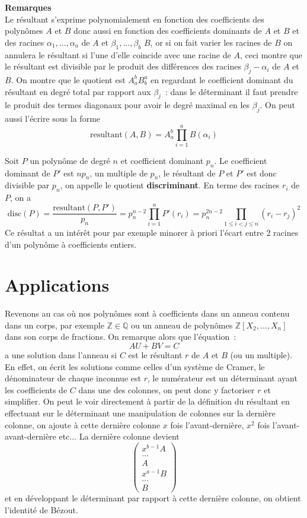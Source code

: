 \documentclass[a4paper,11pt]{book}
\begin{document}
\begin{giacjshere}
{\bf Remarques}\\
Le résultant s'exprime polynomialement en fonction
des coefficients des polynômes $A$ et $B$ donc aussi en fonction
des coefficients dominants de $A$ et $B$ et des racines 
$\alpha_1,..., \alpha_a$ de $A$ et $\beta_1,...,\beta_b$ $B$,
or si on fait varier les racines de $B$ on annulera le résultant
si l'une d'elle coincide avec une racine de $A$, ceci montre
que le résultant est divisible par le produit des 
différences des racines $\beta_j-\alpha_i$ de $A$ et $B$. 
On montre que le quotient 
est $A_a^b B_b^a$ en regardant le coefficient
dominant du résultant en degr\'e total par rapport aux $\beta_j$~:
dans le d\'eterminant il faut prendre le produit des termes diagonaux
pour avoir le degr\'e maximal en les $\beta_j$.
On peut aussi l'\'ecrire sous la forme
$$ \mbox{resultant}(A,B)=A_a^b \prod_{i=1}^a B(\alpha_i)$$

Soit $P$ un polyn\^ome de degr\'e $n$ et coefficient dominant $p_n$.
Le coefficient dominant de $P'$ est $np_n$, un multiple de $p_n$, 
le r\'esultant de $P$ et $P'$ est donc divisible
par $p_n$, on appelle le quotient
{\bf discriminant}. En terme des racines $r_i$ de $P$, on a
$$ \mbox{disc}(P)=\frac{\mbox{resultant}(P,P')}{p_n}
=p_n^{n-2} \prod_{i=1}^n P'(r_i) = p_n^{2n-2} \prod_{1\leq i<j\leq n} (r_i-r_j)^2$$
Ce résultat a un intérêt pour par exemple minorer à priori l'écart entre
2 racines d'un polynôme à coefficients entiers.


\section{Applications}
Revenons au cas o\`u nos polyn\^omes sont \`a coefficients dans un
anneau contenu dans un corps, par exemple $\mathbb{Z} \in \mathbb{Q}$ ou un anneau 
de polyn\^omes $\mathbb{Z}[X_2,...,X_n] $  dans son corps de fractions.
On remarque alors que l'\'equation~:
$$ AU+BV=C$$
a une solution dans l'anneau si $C$ est le r\'esultant $r$
de $A$ et $B$ (ou un multiple). En effet, on \'ecrit les solutions comme 
celles d'un syst\`eme de Cramer, le d\'enominateur
de chaque inconnue est $r$, le num\'erateur 
est un d\'eterminant ayant les coefficients de $C$ dans une
des colonnes, on peut donc y factoriser $r$ et simplifier.
On peut le voir directement \`a partir de la d\'efinition du
r\'esultant en effectuant sur le d\'eterminant
une manipulation de colonnes sur la derni\`ere colonne,
on ajoute \`a cette derni\`ere colonne $x$ fois l'avant-derni\`ere,
$x^2$ fois l'avant-avant-derni\`ere etc... La derni\`ere colonne
devient 
$$ \left( \begin{array}{c} x^{b-1} A \\
... \\
A \\
x^{a-1} B \\
...\\
B
\end{array} \right)$$
et en d\'eveloppant le d\'eterminant par rapport \`a cette 
derni\`ere colonne, on obtient l'identit\'e de B\'ezout.


\end{giacjshere}
\end{document}
